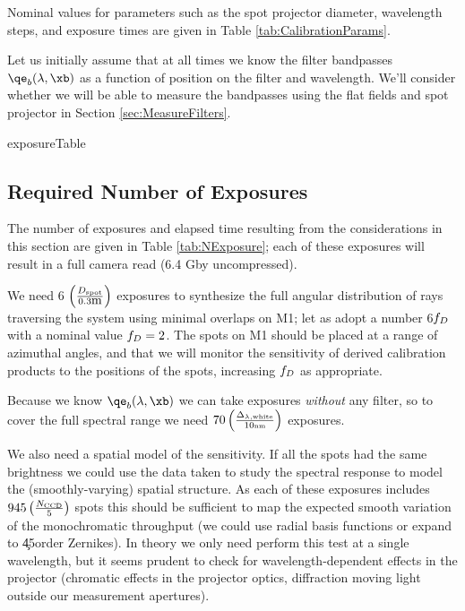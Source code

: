Nominal values for parameters such as the spot projector diameter, wavelength steps, and exposure
times are given in Table \ref{tab:CalibrationParams}.

Let us initially assume that at all times we know the filter bandpasses $\qe_b(\lambda, \xb)$
as a function of position on the filter and wavelength.  We'll consider whether we will be able
to measure the bandpasses using the flat fields and spot projector in Section \ref{sec:MeasureFilters}.

%
%
{exposureTable}


\subsection{Required Number of Exposures}

The number of exposures and elapsed time resulting from the considerations in this section are given in Table
\ref{tab:NExposure}; each of these exposures will result in a full camera read (6.4 Gby uncompressed).

We need 6 $\left(\frac{D_{\mbox{\tiny spot}}}{0.3\mbox{m}}\right)$ exposures to synthesize the full angular distribution of rays traversing the
system using minimal overlaps on M1; let as adopt a number 6$f_D$ with a nominal value
$f_D = 2$.  The
spots on M1 should be placed at a range of azimuthal angles, and that we will monitor the sensitivity
of derived calibration products to the positions of the spots, increasing $f_D$ as appropriate.

Because we know $\qe_b(\lambda, \xb)$ we can take exposures \textit{without} any filter, so to cover
the full spectral range we need $70 \left(\frac{\Delta_{\lambda,\mbox{\tiny white}}}{10\mbox{\tiny nm}}\right)$ exposures.

We also need a spatial model of the sensitivity.  If all the spots had the same brightness we could use the
data taken to study the spectral response to model the (smoothly-varying) spatial structure.  As each of these
exposures includes $945 \left(\frac{N_{\mbox{\tiny CCD}}}{5}\right)$ spots this should be sufficient to map the expected smooth variation of the
monochromatic throughput (\eg we could use radial basis functions or expand to \c 45\th order Zernikes).  In
theory we only need perform this test at a single wavelength, but it seems prudent to check for
wavelength-dependent effects in the projector (\eg chromatic effects in the projector optics, diffraction
moving light outside our measurement apertures).

